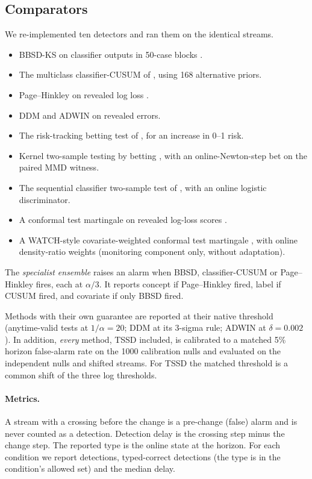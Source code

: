 \subsection{Comparators}
We re-implemented ten detectors and ran them on the identical streams.
\begin{itemize}[itemsep=0.05em]
\item BBSD-KS on classifier outputs in 50-case blocks \citep{rabanser2019}.
\item The multiclass classifier-CUSUM of \citet{evans2024}, using 168 alternative priors.
\item Page--Hinkley on revealed log loss \citep{page1954}.
\item DDM \citep{gama2004ddm} and ADWIN \citep{bifet2007adwin} on revealed errors.
\item The risk-tracking betting test of \citet{podkopaev2022}, for an increase in 0--1 risk.
\item Kernel two-sample testing by betting \citep{shekhar2023}, with an online-Newton-step bet on the paired MMD witness.
\item The sequential classifier two-sample test of \citet{jang2022}, with an online logistic discriminator.
\item A conformal test martingale on revealed log-loss scores \citep{vovk2021retrain,vovk2020concept}.
\item A WATCH-style covariate-weighted conformal test martingale \citep{prinster2025watch}, with online density-ratio weights (monitoring component only, without adaptation).
\end{itemize}
The \emph{specialist ensemble} raises an alarm when BBSD, classifier-CUSUM or Page--Hinkley fires, each at $\alpha/3$. It reports concept if Page--Hinkley fired, label if CUSUM fired, and covariate if only BBSD fired.

Methods with their own guarantee are reported at their native threshold (anytime-valid tests at $1/\alpha=20$; DDM at its 3-sigma rule; ADWIN at $\delta=0.002$). In addition, \emph{every} method, TSSD included, is calibrated to a matched 5\% horizon false-alarm rate on the 1000 calibration nulls and evaluated on the independent nulls and shifted streams. For TSSD the matched threshold is a common shift of the three log thresholds.

\paragraph{Metrics.} A stream with a crossing before the change is a pre-change (false) alarm and is never counted as a detection. Detection delay is the crossing step minus the change step. The reported type is the online state at the horizon. For each condition we report detections, typed-correct detections (the type is in the condition's allowed set) and the median delay.
